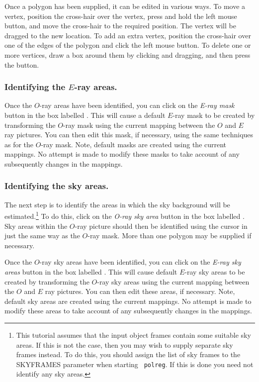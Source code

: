 Once a polygon has been supplied, it can be edited in various ways. To
move a vertex, position the cross-hair over the vertex, press and hold
the left mouse button, and move the cross-hair to the required position.
The vertex will be dragged to the new location. To add an extra vertex,
position the cross-hair over one of the edges of the polygon and click
the left mouse button. To delete one or more vertices, draw a box around 
them by clicking and dragging, and then press the  button.

\subsubsection {Identifying the $E$-ray areas.}
Once the $O$-ray areas have been identified, you can click on the {\em
E-ray mask} button in the box labelled . This will cause a default $E$-ray mask to be
created by transforming the $O$-ray mask using the current mapping
between the $O$ and $E$ ray pictures. You can then edit this mask, if
necessary, using the same techniques as for the $O$-ray mask. Note,
default masks are created using the current mappings. No attempt is made
to modify these masks to take account of any subsequently changes in
the mappings.

\subsubsection {Identifying the sky areas.}
The next step is to identify the areas in which the sky background will
be estimated.\footnote{This tutorial assumes that the input object frames
contain some suitable sky areas. If this is not the case, then you may
wish to supply separate sky frames instead. To do this, you should assign
the list of sky frames to the SKYFRAMES parameter when starting {\tt
polreg}. If this is done you need not identify any sky areas.} 
To do this, click on the {\em O-ray sky area} button in the box
labelled . Sky areas within
the $O$-ray picture should then be identified using the cursor in just the 
same way as the $O$-ray mask. More than one polygon may be supplied if
necessary. 

Once the $O$-ray sky areas have been identified, you can click on the
{\em E-ray sky areas} button in the box labelled . This will cause default $E$-ray sky areas to
be created by transforming the $O$-ray sky areas using the current
mapping between the $O$ and $E$ ray pictures. You can then edit these
areas, if necessary. Note, default sky areas are created using the
current mappings. No attempt is made to modify these areas to take
account of any subsequently changes in the mappings.

